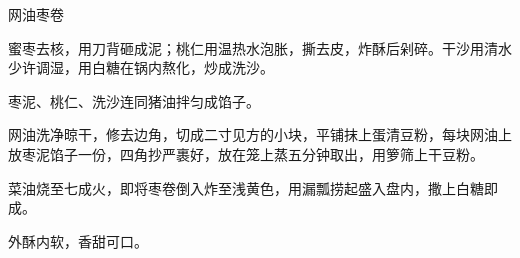 %
%
%
%
%
%
%
\begin{recipe}{网油枣卷}

\ingredients


\preparation

\step 蜜枣去核，用刀背砸成泥；桃仁用温热水泡胀，撕去皮，炸酥后剁碎。干沙用清水
少许调湿，用白糖在锅内熬化，炒成洗沙。

\step 枣泥、桃仁、洗沙连同猪油拌匀成馅子。

\step 网油洗净晾干，修去边角，切成二寸见方的小块，平铺抹上蛋清豆粉，每块网油上
放枣泥馅子一份，四角抄严裹好，放在笼上蒸五分钟取出，用箩筛上干豆粉。

\step 菜油烧至七成火，即将枣卷倒入炸至浅黄色，用漏瓢捞起盛入盘内，撒上白糖即
成。

\features

外酥内软，香甜可口。

\end{recipe}

